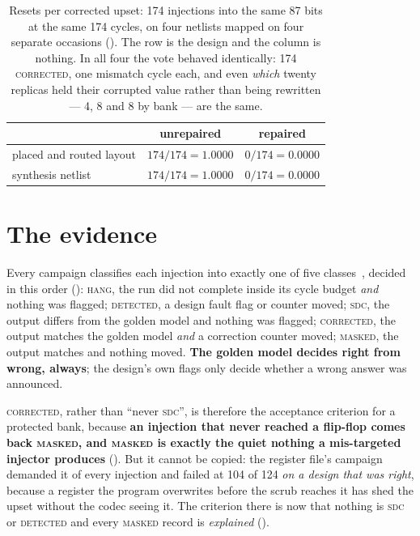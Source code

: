 \begin{table}[tbp]
\centering
\small
\caption{Resets per corrected upset: 174 injections into the same 87
bits at the same 174 cycles, on four netlists mapped on four separate
occasions (). The row is the design and the
column is nothing. In all four the vote behaved identically: 174
\textsc{corrected}, one mismatch cycle each, and even \emph{which}
twenty replicas held their corrupted value rather than being rewritten
--- 4, 8 and 8 by bank --- are the same.}
\label{tab:w9}
\begin{tabular}{lcc}
\toprule
 & unrepaired & repaired \\
\midrule
placed and routed layout & $174/174 = 1.0000$ & $0/174 = 0.0000$ \\
synthesis netlist & $174/174 = 1.0000$ & $0/174 = 0.0000$ \\
\bottomrule
\end{tabular}
\end{table}

\section{The evidence}
\label{sec:harden-evidence}

Every campaign classifies each injection into exactly one of five
classes~\cite{cho2013}, decided in this order ():
\textsc{hang}, the run did not complete inside its cycle budget
\emph{and} nothing was flagged; \textsc{detected}, a design fault flag
or counter moved; \textsc{sdc}, the output differs from the golden model
and nothing was flagged; \textsc{corrected}, the output matches the
golden model \emph{and} a correction counter moved; \textsc{masked}, the
output matches and nothing moved. \textbf{The golden model decides right
from wrong, always}; the design's own flags only decide whether a wrong
answer was announced.

\textsc{corrected}, rather than ``never \textsc{sdc}'', is therefore the
acceptance criterion for a protected bank, because \textbf{an injection
that never reached a flip-flop comes back \textsc{masked}, and
\textsc{masked} is exactly the quiet nothing a mis-targeted injector
produces} (). But it cannot be copied: the
register file's campaign demanded it of every injection and failed at
104 of 124 \emph{on a design that was right}, because a register the
program overwrites before the scrub reaches it has shed the upset
without the codec seeing it. The criterion there is now that nothing is
\textsc{sdc} or \textsc{detected} and every \textsc{masked} record is
\emph{explained} ().

